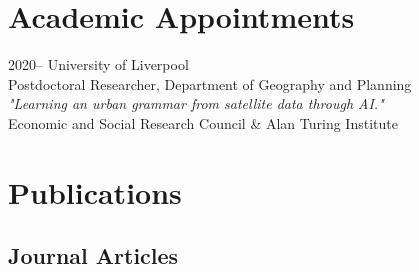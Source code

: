\documentclass[12pt,a4paper]{report}
\begin{document}
    \section*{Academic Appointments}

    \begin{tablist}

        \item[2020--] \tab{}University of Liverpool \\
                            Postdoctoral Researcher, Department of Geography and Planning \\
                            \textit{"Learning an urban grammar from satellite data through AI."} \\
                            Economic and Social Research Council \& Alan Turing Institute

    \end{tablist}

    \section*{Publications}

    \subsection*{Journal Articles}
\end{document}
